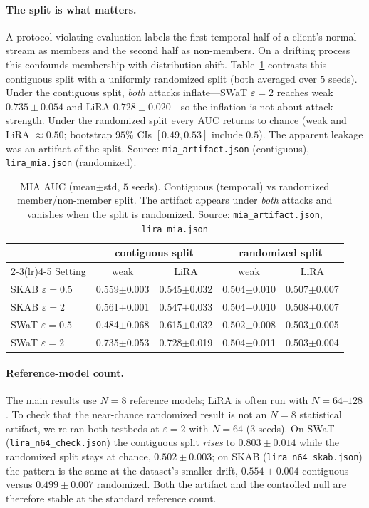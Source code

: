 \documentclass{article}
\providecommand{\botrule}{\bottomrule}%
\begin{document}
\paragraph{The split is what matters.} A protocol-violating evaluation labels the first
temporal half of a client's normal stream as members and the second half as non-members.
On a drifting process this confounds membership with distribution shift. Table~\ref{tab:lira}
contrasts this contiguous split with a uniformly randomized split (both averaged over $5$
seeds). Under the contiguous split, \emph{both} attacks inflate---SWaT $\varepsilon{=}2$
reaches weak $0.735\pm0.054$ and LiRA $0.728\pm0.020$---so the inflation is not about attack
strength. Under the randomized split every AUC returns to chance (weak and LiRA
$\approx0.50$; bootstrap $95\%$ CIs $[0.49,0.53]$ include $0.5$). The apparent leakage was an
artifact of the split. Source: \texttt{mia\_artifact.json} (contiguous),
\texttt{lira\_mia.json} (randomized).

\begin{table}[h]\centering
\caption{MIA AUC (mean$\pm$std, $5$ seeds). Contiguous (temporal) vs randomized
member/non-member split. The artifact appears under \emph{both} attacks and vanishes when
the split is randomized. Source: \texttt{mia\_artifact.json}, \texttt{lira\_mia.json}}\label{tab:lira}
\begin{tabular}{@{}lcccc@{}}
\toprule
 & \multicolumn{2}{c}{contiguous split} & \multicolumn{2}{c}{randomized split} \\
\cmidrule(lr){2-3}\cmidrule(lr){4-5}
Setting & weak & LiRA & weak & LiRA \\
\midrule
SKAB $\varepsilon{=}0.5$ & 0.559$\pm$0.003 & 0.545$\pm$0.032 & 0.504$\pm$0.010 & 0.507$\pm$0.007 \\
SKAB $\varepsilon{=}2$   & 0.561$\pm$0.001 & 0.547$\pm$0.033 & 0.504$\pm$0.010 & 0.508$\pm$0.007 \\
SWaT $\varepsilon{=}0.5$ & 0.484$\pm$0.068 & 0.615$\pm$0.032 & 0.502$\pm$0.008 & 0.503$\pm$0.005 \\
SWaT $\varepsilon{=}2$   & 0.735$\pm$0.053 & 0.728$\pm$0.019 & 0.504$\pm$0.011 & 0.503$\pm$0.004 \\
\botrule
\end{tabular}
\end{table}

\paragraph{Reference-model count.} The main results use $N{=}8$ reference models; LiRA is
often run with $N{=}64$--$128$. To check that the near-chance randomized result is not an
$N{=}8$ statistical artifact, we re-ran both testbeds at $\varepsilon{=}2$ with $N{=}64$
($3$ seeds). On SWaT (\texttt{lira\_n64\_check.json}) the contiguous split \emph{rises}
to $0.803\pm0.014$ while the randomized split stays at chance, $0.502\pm0.003$; on SKAB
(\texttt{lira\_n64\_skab.json}) the pattern is the same at the dataset's smaller drift,
$0.554\pm0.004$ contiguous versus $0.499\pm0.007$ randomized. Both the artifact and the controlled null are therefore stable at the standard reference count.
\end{document}
